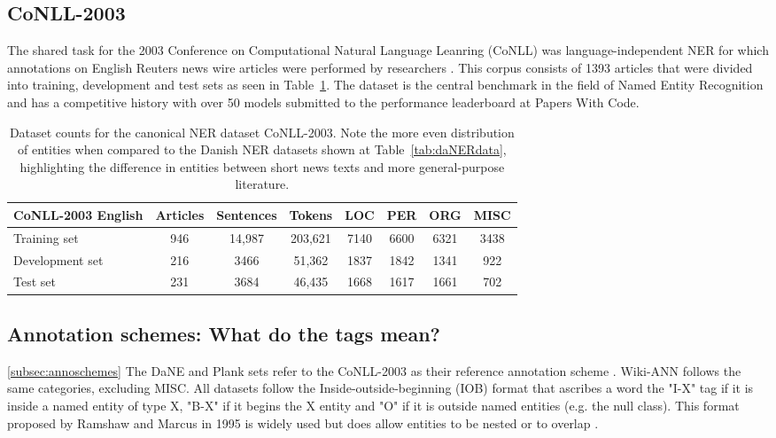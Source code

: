 \documentclass[main.tex]{subfiles}
\begin{document}
\subsection{CoNLL-2003}
The shared task for the 2003 Conference on Computational Natural Language Leanring (CoNLL) was language-independent NER for which annotations on English Reuters news wire articles were performed by researchers \cite{tjang2003conll}.
This corpus consists of 1393 articles that were divided into training, development and test sets as seen in Table~\ref{tab:conll2003}.
The dataset is the central benchmark in the field of Named Entity Recognition \cite[Sec. 4.3]{yamada2020luke} and has a competitive history with over 50 models submitted to the performance leaderboard at Papers With Code\footnotemark.
\begin{table}[H]
    \centering
    \begin{tabular}{l|ccc|cccc}
    CoNLL-2003 English  & Articles  & Sentences  & Tokens   & LOC   & PER   & ORG   & MISC  \\ \hline
    Training set        & 946       & 14,987     & 203,621  & 7140  & 6600  & 6321  & 3438   \\
    Development set     & 216       & 3466      & 51,362   & 1837  & 1842  & 1341  & 922    \\
    Test set            & 231       & 3684      & 46,435   & 1668  & 1617  & 1661  & 702    \\
    \end{tabular}
    \caption{
        Dataset counts for the canonical NER dataset CoNLL-2003.
        Note the more even distribution of entities when compared to the Danish NER datasets shown at Table~\ref{tab:daNERdata}, highlighting the difference in entities between short news texts and more general-purpose literature.
    }
    \label{tab:conll2003}
\end{table}

\subsection{Annotation schemes: What do the tags mean?}
\ref{subsec:annoschemes}
The DaNE and Plank sets refer to the CoNLL-2003 as their reference annotation scheme \cite[Sec. 4]{hvingelby2020dane} \cite[Sec. 2.1]{plank2019neural}.
Wiki-ANN follows the same categories, excluding MISC.
All datasets follow the Inside-outside-beginning (IOB) format that ascribes a word the "I-X" tag if it is inside a named entity of type X, "B-X" if it begins the X entity and "O" if it is outside named entities (e.g. the null class).
This format proposed by Ramshaw and Marcus in 1995 is widely used but does allow entities to be nested or to overlap \cite{ramshaw1995IOB}.
\end{document}
